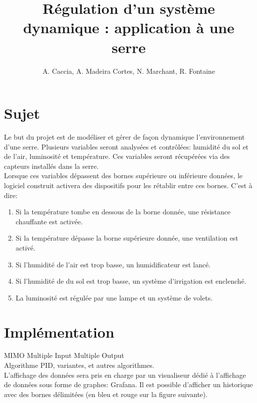 \documentclass[a4paper,10pt]{article}
\title{Régulation d'un système dynamique : application à une serre}
\author{A. Caccia, A. Madeira Cortes, N. Marchant, R. Fontaine}
\date{ }
\begin{document}
\maketitle

\vspace{1cm}

\section{Sujet}

Le but du projet est de modéliser et gérer de façon dynamique l'environnement d'une serre. Plusieurs variables seront analysées et contrôlées: humidité du sol et de l'air, luminosité et température. Ces variables seront récupérées via des capteurs installés dans la serre. \\

Lorsque ces variables dépassent des bornes supérieure ou inférieure données, le logiciel construit activera des dispositifs pour les rétablir entre ces bornes. C'est à dire: \\

\begin{enumerate}
	\item Si la température tombe en dessous de la borne donnée, une résistance chauffante est activée.
	\item Si la température dépasse la borne supérieure donnée, une ventilation est activé.
	\item Si l'humidité de l'air est trop basse, un humidificateur est lancé.
	\item Si l'humidité de du sol est trop basse, un système d'irrigation est enclenché.
	\item La luminosité est régulée par une lampe et un système de volets.\\
\end{enumerate}

\section{Implémentation}

MIMO Multiple Input Multiple Output \\

Algorithme PID, variantes, et autres algorithmes.\\

L'affichage des données sera pris en charge par un visualiseur dédié à l'affichage de données sous forme de graphes: Grafana. Il est possible d'afficher un historique avec des bornes délimitées (en bleu et rouge sur la figure suivante). \\
\end{document}
